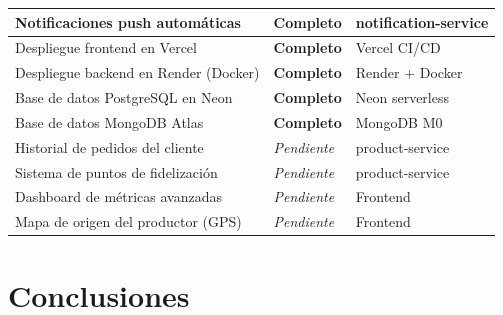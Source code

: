 \documentclass[12pt,a4paper]{article}
\begin{document}
\begin{center}
\begin{longtable}{|L{7.5cm}|C{2.2cm}|L{4.3cm}|}
\hline
Notificaciones push autom\'aticas                  & \textbf{Completo}   & notification-service \\
\hline
{}
Despliegue frontend en Vercel                      & \textbf{Completo}   & Vercel CI/CD \\
\hline
Despliegue backend en Render (Docker)              & \textbf{Completo}   & Render + Docker \\
\hline
{}
Base de datos PostgreSQL en Neon                   & \textbf{Completo}   & Neon serverless \\
\hline
Base de datos MongoDB Atlas                        & \textbf{Completo}   & MongoDB M0 \\
\hline
{}
Historial de pedidos del cliente                   & \textit{Pendiente}  & product-service \\
\hline
{}
Sistema de puntos de fidelizaci\'on                & \textit{Pendiente}  & product-service \\
\hline
{}
Dashboard de m\'etricas avanzadas                  & \textit{Pendiente}  & Frontend \\
\hline
{}
Mapa de origen del productor (GPS)                 & \textit{Pendiente}  & Frontend \\
\hline
\end{longtable}
\end{center}

\section*{Conclusiones}
\end{document}
